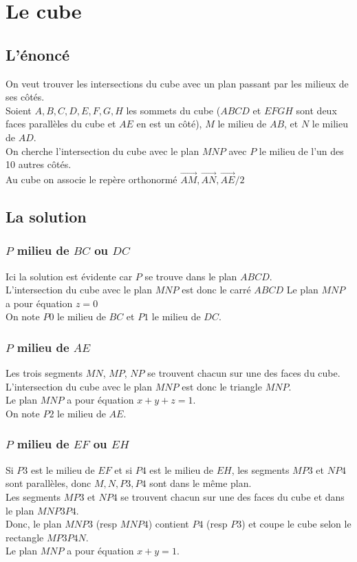 \documentclass[a4paper,11pt]{book}
\begin{document}
\section{Le cube}
\subsection{L'\'enonc\'e}
On veut trouver les intersections du cube avec un plan passant par les milieux
de ses c\^ot\'es.\\
Soient $A,B,C,D,E,F,G,H$ les sommets du cube ($ABCD$ et $EFGH$ sont deux faces 
parall\`eles du cube et $AE$ en est un c\^ot\'e), $M$ le milieu de $AB$, et $N$
le milieu de $AD$.\\
On cherche l'intersection du cube avec le plan $MNP$ avec $P$ le milieu de
l'un des 10 autres c\^ot\'es.\\
Au cube on associe le rep\`ere orthonorm\'e 
$\overrightarrow{AM},\overrightarrow{AN},\overrightarrow{AE}/2$
\subsection{La solution}
\subsubsection{$P$ milieu de $BC$ ou $DC$}
Ici la solution est \'evidente car $P$ se trouve dans le plan $ABCD$.\\
L'intersection du cube avec le plan $MNP$ est donc le carr\'e $ABCD$ 
Le plan $MNP$ a pour \'equation $z=0$\\
On note $P0$ le milieu de $BC$ et  $P1$ le milieu de $DC$. 
\subsubsection{$P$ milieu de $AE$}
Les trois segments $MN$, $MP$, $NP$ se trouvent chacun sur une des faces du 
cube.\\
L'intersection du cube avec le plan $MNP$ est donc le triangle $MNP$.\\ 
Le plan $MNP$ a pour \'equation $x+y+z=1$.\\
On note $P2$ le milieu de $AE$.
\subsubsection{$P$ milieu de $EF$ ou $EH$}
Si $P3$ est le milieu de $EF$ et si $P4$ est le milieu de $EH$, les segments
$MP3$ et $NP4$ sont parall\`eles, donc $M,N,P3,P4$ sont dans le m\^eme plan.\\
Les segments $MP3$ et $NP4$  se trouvent chacun sur une des faces du 
cube et dans le plan $MNP3P4$.\\
Donc, le plan $MNP3$ (resp $MNP4$) contient $P4$ (resp $P3$) et coupe le 
cube selon le rectangle $MP3P4N$.\\ 
Le plan $MNP$ a pour \'equation $x+y=1$.
\end{document}
